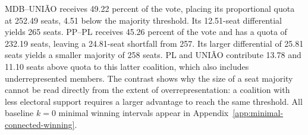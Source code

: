 \documentclass[11pt]{article}
\begin{document}
MDB--UNIÃO receives 49.22 percent of the vote, placing its proportional
quota at 252.49 seats, 4.51 below the majority threshold. Its 12.51-seat
differential yields 265 seats. PP--PL receives 45.26 percent of the vote
and has a quota of 232.19 seats, leaving a 24.81-seat shortfall from 257.
Its larger differential of 25.81 seats yields a smaller majority of 258
seats. PL and UNIÃO contribute 13.78 and 11.10 seats above quota to this
latter coalition, which also includes underrepresented members. The
contrast shows why the size of a seat majority cannot be read directly
from the extent of overrepresentation: a coalition with less electoral
support requires a larger advantage to reach the same threshold. All baseline
\(k=0\) minimal winning intervals appear in
Appendix~\ref{app:minimal-connected-winning}.

\end{document}

